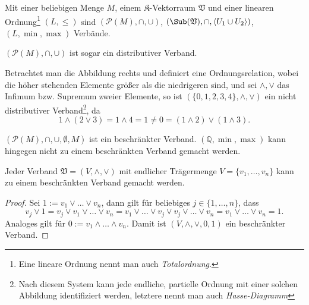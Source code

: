 \begin{example}
    Mit einer beliebigen Menge $M$, einem $\mathfrak{K}$-Vektorraum $\mathfrak{V}$ und einer linearen Ordnung\footnote{Eine lineare Ordnung nennt man auch \emph{Totalordnung}.} $(L, \le)$ sind $(\mathcal{P}(M), \cap, \cup)$, $(\Sub(\mathfrak{V}), \cap, \langle U_1 \cup U_2 \rangle)$, $(L, \min, \max)$ Verbände.

    $(\mathcal{P}(M), \cap, \cup)$ ist sogar ein distributiver Verband.

    \begin{minipage}{0.56\textwidth}
        Betrachtet man die Abbildung rechts und definiert eine Ordnungsrelation, wobei die höher stehenden Elemente größer als die niedrigeren sind, und sei $\wedge, \vee$ das Infimum bzw. Supremum zweier Elemente, so ist $(\{0,1,2,3,4\}, \wedge, \vee)$ ein nicht distributiver Verband\footnote{Nach diesem System kann jede endliche, partielle Ordnung mit einer solchen Abbildung identifiziert werden, letztere nennt man auch \emph{Hasse-Diagramm}}, da
        $$ 1 \wedge (2 \vee 3) = 1 \wedge 4 = 1 \neq 0 = (1 \wedge 2) \vee ( 1 \wedge 3). $$
    \end{minipage}
    \hspace{0.02\textwidth}
    \begin{minipage}{0.4\textwidth}
        \centering
    \end{minipage}

    $(\mathcal{P}(M), \cap, \cup, \emptyset, M)$ ist ein beschränkter Verband. $(\mathbb{Q}, \min, \max)$ kann hingegen nicht zu einem beschränkten Verband gemacht werden.
\end{example}

\begin{lemma}
    Jeder Verband $\mathfrak{V} = (V, \wedge, \vee)$ mit endlicher Trägermenge $V = \{v_1, \ldots, v_n\}$ kann zu einem beschränkten Verband gemacht werden.
\end{lemma}
\begin{proof}
    Sei $1 := v_1 \vee \ldots \vee v_n$, dann gilt für beliebiges $j \in \{1, \ldots, n\}$, dass $$v_j \vee 1 = v_j \vee v_1 \vee \ldots \vee v_n =  v_1 \vee \ldots \vee v_j \vee v_j \vee \ldots \vee v_n = v_1 \vee \ldots \vee v_n = 1.$$
    Analoges gilt für $0 := v_1 \wedge \ldots \wedge v_n$. Damit ist $(V, \wedge, \vee, 0, 1)$ ein beschränkter Verband. 
\end{proof}

